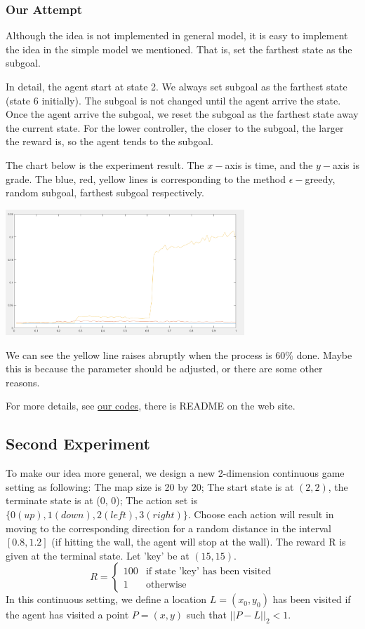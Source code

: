 \documentclass{article}
\begin{document}
\begin{spacing}{1.1}
    \subsubsection{Our Attempt}

    Although the idea is not implemented in general model, it is easy to implement the idea in the simple model we mentioned. That is, set the farthest state as the subgoal.

    In detail, the agent start at state 2. We always set subgoal as the farthest state (state 6 initially). The subgoal is not changed until the agent arrive the state. Once the agent arrive the subgoal, we reset the subgoal as the farthest state away the current state. For the lower controller, the closer to the subgoal, the larger the reward is, so the agent tends to the subgoal.

    The chart below is the experiment result. The $x-$axis is time, and the $y-$axis is grade. The blue, red, yellow lines is corresponding to the method $\epsilon-$greedy, random subgoal, farthest subgoal respectively.

    \includegraphics[width=90mm]{1.png}

    We can see the yellow line raises abruptly when the process is 60\% done. Maybe this is because the parameter should be adjusted, or there are some other reasons.

    For more details, see \href{https://github.com/faebdc/AI-Project}{our codes}, there is README on the web site.

    \subsection{Second Experiment}
    To make our idea more general, we design a new 2-dimension continuous game setting as following: The map size is 20 by 20; The start state is at $(2, 2)$, the terminate state is at (0, 0); The action set is $\{0(up), 1(down), 2(left), 3(right)\}$. Choose each action will result in moving to the corresponding direction for a random distance in the interval $[0.8, 1.2]$ (if hitting the wall, the agent will stop at the wall). The reward R is given at the terminal state. Let 'key' be at $(15, 15)$.
    $$R = \begin{cases}
        100 & \text{if state 'key' has been visited}\\
        1 & \text{otherwise}
    \end{cases}$$
    In this continuous setting, we define a location $L = (x_0, y_0)$ has been visited if the agent has visited a point $P = (x, y)$ such that $||P - L||_2 < 1$.


\end{spacing}
\end{document}
